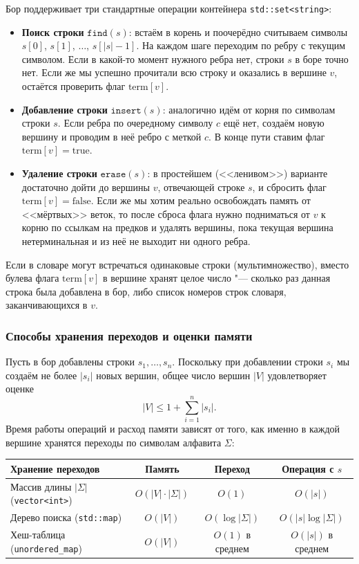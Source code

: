 Бор поддерживает три стандартные операции контейнера \texttt{std::set<string>}:
\begin{itemize}
    \item \textbf{Поиск строки} $\mathtt{find}(s)$: встаём в корень и поочерёдно считываем символы $s[0]$, $s[1]$, $\dots$, $s[|s|-1]$. На каждом шаге переходим по ребру с текущим символом. Если в какой-то момент нужного ребра нет, строки $s$ в боре точно нет. Если же мы успешно прочитали всю строку и оказались в вершине $v$, остаётся проверить флаг $\text{term}[v]$.
    \item \textbf{Добавление строки} $\mathtt{insert}(s)$: аналогично идём от корня по символам строки $s$. Если ребра по очередному символу $c$ ещё нет, создаём новую вершину и проводим в неё ребро с меткой $c$. В конце пути ставим флаг $\text{term}[v] = \text{true}$.
    \item \textbf{Удаление строки} $\mathtt{erase}(s)$: в простейшем (<<ленивом>>) варианте достаточно дойти до вершины $v$, отвечающей строке $s$, и сбросить флаг $\text{term}[v] = \text{false}$. Если же мы хотим реально освобождать память от <<мёртвых>> веток, то после сброса флага нужно подниматься от $v$ к корню по ссылкам на предков и удалять вершины, пока текущая вершина нетерминальная и из неё не выходит ни одного ребра.
\end{itemize}

\begin{note}
    Если в словаре могут встречаться одинаковые строки (мультимножество), вместо булева флага $\text{term}[v]$ в вершине хранят целое число "--- сколько раз данная строка была добавлена в бор, либо список номеров строк словаря, заканчивающихся в $v$.
\end{note}

\subsubsection{Способы хранения переходов и оценки памяти}

Пусть в бор добавлены строки $s_1, \dots, s_n$. Поскольку при добавлении строки $s_i$ мы создаём не более $|s_i|$ новых вершин, общее число вершин $|V|$ удовлетворяет оценке
\[
    |V| \le 1 + \sum_{i=1}^n |s_i|.
\]
Время работы операций и расход памяти зависят от того, как именно в каждой вершине хранятся переходы по символам алфавита $\Sigma$:

\begin{center}
\begin{tabular}{@{}lccc@{}}
    \toprule
    \textbf{Хранение переходов} & \textbf{Память} & \textbf{Переход} & \textbf{Операция с $s$} \\
    \midrule
    Массив длины $|\Sigma|$ (\texttt{vector<int>}) & $O(|V| \cdot |\Sigma|)$ & $O(1)$ & $O(|s|)$ \\
    Дерево поиска (\texttt{std::map}) & $O(|V|)$ & $O(\log |\Sigma|)$ & $O(|s| \log |\Sigma|)$ \\
    Хеш-таблица (\texttt{unordered\_map}) & $O(|V|)$ & $O(1)$ в среднем & $O(|s|)$ в среднем \\
    \bottomrule
\end{tabular}
\end{center}


